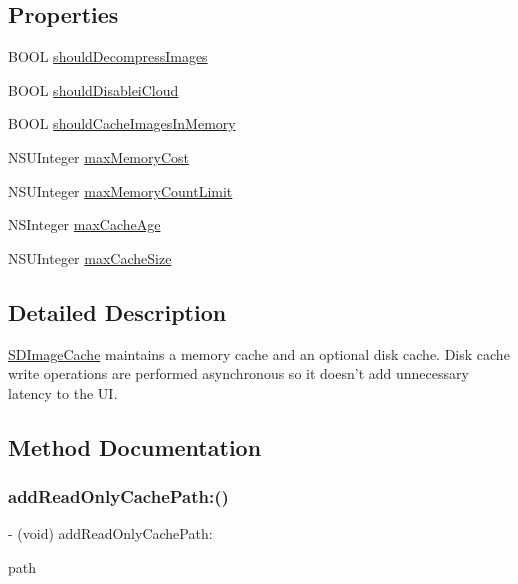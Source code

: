 \subsection*{Properties}
\begin{DoxyCompactItemize}
\item 
B\+O\+OL \mbox{\hyperlink{interface_s_d_image_cache_ae9994880d8e741fff3221b4ecca61a63}{should\+Decompress\+Images}}
\item 
B\+O\+OL \mbox{\hyperlink{interface_s_d_image_cache_a4dab94caee9f8222a1cc03b2c4232b41}{should\+Disablei\+Cloud}}
\item 
B\+O\+OL \mbox{\hyperlink{interface_s_d_image_cache_acedfb1e67ac230bdcaefd2e601267dde}{should\+Cache\+Images\+In\+Memory}}
\item 
N\+S\+U\+Integer \mbox{\hyperlink{interface_s_d_image_cache_ad4cb88a511e5be6961623db24c343405}{max\+Memory\+Cost}}
\item 
N\+S\+U\+Integer \mbox{\hyperlink{interface_s_d_image_cache_a25af9c52316058a4cfd4fda7e0bf707a}{max\+Memory\+Count\+Limit}}
\item 
N\+S\+Integer \mbox{\hyperlink{interface_s_d_image_cache_adbf7dbc8734ac3a8d62c2a800372b108}{max\+Cache\+Age}}
\item 
N\+S\+U\+Integer \mbox{\hyperlink{interface_s_d_image_cache_adfd2955f16b5cb5aaa1f8e6d930229d4}{max\+Cache\+Size}}
\end{DoxyCompactItemize}


\subsection{Detailed Description}
\mbox{\hyperlink{interface_s_d_image_cache}{S\+D\+Image\+Cache}} maintains a memory cache and an optional disk cache. Disk cache write operations are performed asynchronous so it doesn’t add unnecessary latency to the UI. 

\subsection{Method Documentation}
\mbox{\label{interface_s_d_image_cache_a9bfedcc9878284b76502287b4b16c1a6}} 
\subsubsection{\texorpdfstring{add\+Read\+Only\+Cache\+Path\+:()}{addReadOnlyCachePath:()}\hspace{0.1cm}{\footnotesize\ttfamily [1/3]}}
{\footnotesize\ttfamily -\/ (void) add\+Read\+Only\+Cache\+Path\+: \begin{DoxyParamCaption}\item[{(N\+S\+String $\ast$)}]{path }\end{DoxyParamCaption}}

